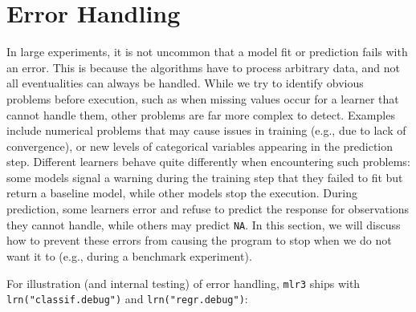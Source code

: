 \begin{Shaded}
\begin{Highlighting}[]
\OtherTok{=} \NormalTok{(}\NormalTok{)}
\OtherTok{=} \NormalTok{(}\NormalTok{)}
\SpecialCharTok{$}

\SpecialCharTok{::}\NormalTok{(}\NormalTok{, } \NormalTok{)}
\SpecialCharTok{$}\OtherTok{=} 

\OtherTok{=}\SpecialCharTok{$}
\end{Highlighting}
\end{Shaded}

\hypertarget{sec-error-handling}{%
\section{Error Handling}\label{sec-error-handling}}

In large experiments, it is not uncommon that a model fit or prediction
fails with an error. This is because the algorithms
have to process arbitrary data, and not all eventualities can always be
handled. While we try to identify obvious problems before execution,
such as when missing values occur for a learner that cannot handle them,
other problems are far more complex to detect. Examples include
numerical problems that may cause issues in training (e.g., due to lack
of convergence), or new levels of categorical variables appearing in the
prediction step. Different learners behave quite differently when
encountering such problems: some models signal a warning during the
training step that they failed to fit but return a baseline model, while
other models stop the execution. During prediction, some learners error
and refuse to predict the response for observations they cannot handle,
while others may predict \texttt{NA}. In this section, we will discuss
how to prevent these errors from causing the program to stop when we do
not want it to (e.g., during a benchmark experiment).

For illustration (and internal testing) of error handling, \texttt{mlr3}
ships with \texttt{lrn("classif.debug")} and \texttt{lrn("regr.debug")}:

